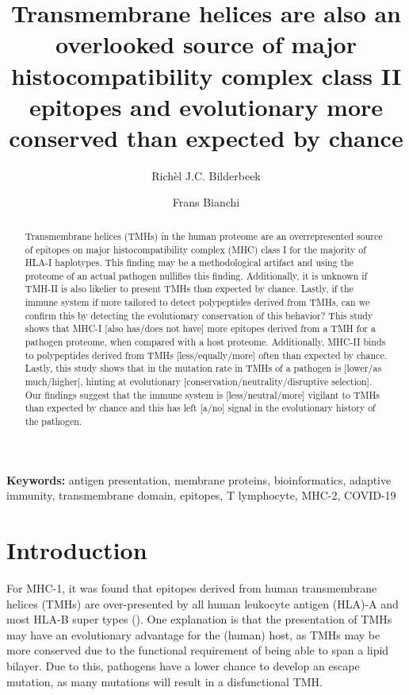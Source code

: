 \documentclass{article}
\title{
  Transmembrane helices are also 
  an overlooked source of major histocompatibility complex class II epitopes
  and evolutionary more conserved than expected by chance
}
\author[1]{Rich\`el J.C. Bilderbeek}
\author[2]{Frans Bianchi}
\affil[1]{Groningen Institute for Evolutionary Life Sciences, University of 
Groningen, Groningen, The Netherlands}
\affil[2]{Frans' Institute, University of Groningen, Groningen, The Netherlands}
\begin{document}
\maketitle

\begin{abstract}

Transmembrane helices (TMHs) in the human proteome
are an overrepresented source of epitopes on major 
histocompatibility complex (MHC) class I for the majority of HLA-I haplotypes. 
This finding may be a methodological artifact and using the proteome
of an actual pathogen nullifies this finding.
Additionally, it is unknown if TMH-II is also likelier to present
TMHs than expected by chance. 
Lastly, if the immune system if more tailored to detect polypeptides
derived from TMHs, can we confirm this by detecting the evolutionary
conservation of this behavior?
This study shows that MHC-I [also has/does not have] more
epitopes derived from a TMH for a pathogen proteome, when compared with
a host proteome.
Additionally, MHC-II binds to polypeptides derived from TMHs 
[less/equally/more] often than expected by chance.
Lastly, this study shows that in the mutation rate in TMHs of a pathogen
is [lower/as much/higher], hinting at 
evolutionary [conservation/neutrality/disruptive selection].
Our findings suggest that the immune system is [less/neutral/more]
vigilant to TMHs than expected by chance and this has left [a/no]
signal in the evolutionary history of the pathogen.

\end{abstract}

{\bf Keywords:} antigen presentation, membrane proteins, bioinformatics, 
adaptive immunity, transmembrane domain, epitopes, T lymphocyte, MHC-2,
COVID-19

\section{Introduction}

For MHC-1, it was found that epitopes derived 
from human transmembrane helices (TMHs)
are over-presented by all human leukocyte antigen (HLA)-A and 
most HLA-B super types (\cite{bianchi2017}). 
One explanation is that the presentation of TMHs 
may have an evolutionary advantage for 
the (human) host, as TMHs may be more 
conserved due to the functional requirement of being able to span a lipid 
bilayer. 
Due to this, pathogens have a lower chance to develop an escape mutation,
as many mutations will result in a disfunctional TMH.
\end{document}
